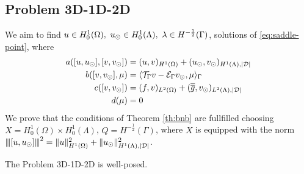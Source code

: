 \subsection{Problem 3D-1D-2D}
We aim to find $u \in H^1_0(\Omega),\ u_{\odot} \in H_0^1(\Lambda), \ \lambda \in H^{-\frac12}(\Gamma )$,
solutions of \eqref{eq:saddle-point}, where
\begin{align*}
a([u, u_{\odot}], [v, v_{\odot}])&= (u,v)_{H^1(\Omega)} + (u_{\odot},v_{\odot})_{H^1(\Lambda),|\mathcal{D}|}
\\
b([v, v_{\odot}], \mu)&= \langle {\mathcal{T}_\Gamma} v - \mathcal{E}_\Gamma v_{\odot} , \mu \rangle_\Gamma
\\
c([v,v_{\odot}])&= (f,v)_{L^2(\Omega)} + (\overline{\overline{g}},v_{\odot})_{L^2(\Lambda),|\mathcal{D}|}
\\
d(\mu)&=0
\end{align*}
We prove that the conditions of Theorem \ref{th:bnb} are fullfilled choosing 
$X=H^1_0(\Omega) \times H^1_0(\Lambda)$, $Q=H^{-\frac 12}(\Gamma)$, where $X$  is equipped with the norm ${\left\vert\kern-0.25ex\left\vert\kern-0.25ex\left\vert [u,u_{\odot} ] \right\vert\kern-0.25ex\right\vert\kern-0.25ex\right\vert}^2=\|u\|^2_{H^1(\Omega)} + \|u_{\odot}\|^2_{H^1(\Lambda),|\mathcal{D}|}$.
\begin{lemma}\label{lemma:prob1_boundedness} 
The Problem 3D-1D-2D is well-posed.
\end{lemma}
